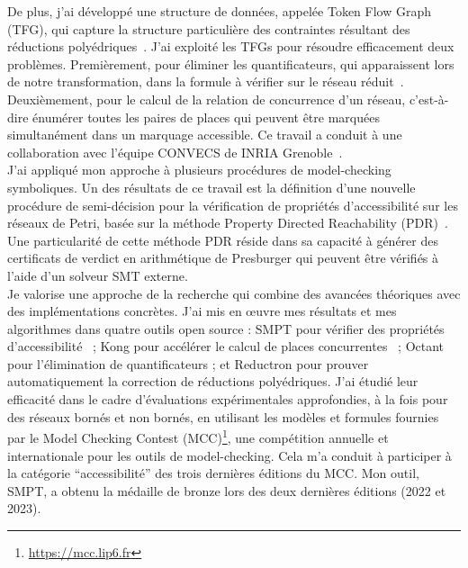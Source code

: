 De plus, j'ai développé une structure de données, appelée Token Flow Graph
(TFG), qui capture la structure particulière des contraintes résultant des
réductions polyédriques~\cite{amat_accelerating_2021,amat_leveraging_2022}. J'ai exploité les TFGs
pour résoudre efficacement deux problèmes. Premièrement, pour éliminer les
quantificateurs, qui apparaissent lors de notre transformation, dans la formule
à vérifier sur le réseau réduit~\cite{amat_project_2024}. Deuxièmement, pour le
calcul de la relation de concurrence d'un réseau, c'est-à-dire énumérer toutes
les paires de places qui peuvent être marquées simultanément dans un marquage
accessible. Ce travail a conduit à une collaboration avec l'équipe CONVECS de
INRIA Grenoble~\cite{amat_toolchain_2023}.\\

J'ai appliqué mon approche à plusieurs procédures de model-checking symboliques.
Un des résultats de ce travail est la définition d'une nouvelle procédure de
semi-décision pour la vérification de propriétés d'accessibilité sur les réseaux
de Petri, basée sur la méthode Property Directed Reachability
(PDR)~\cite{amat_property_2022}. Une particularité de cette méthode PDR réside
dans sa capacité à générer des certificats de verdict en arithmétique de
Presburger qui peuvent être vérifiés à l'aide d'un solveur SMT externe.\\

Je valorise une approche de la recherche qui combine des avancées théoriques avec
des implémentations concrètes. J'ai mis en œuvre mes résultats et mes algorithmes
dans quatre outils open source : \textsf{SMPT} pour vérifier des propriétés
d'accessibilité~\cite{amat_smpt_2023} ; \textsf{Kong} pour accélérer le calcul de places concurrentes~\cite{amat_kong_2022}
; \textsf{Octant} pour l'élimination de quantificateurs ; et \textsf{Reductron} pour
prouver automatiquement la correction de réductions polyédriques. J'ai étudié
leur efficacité dans le cadre d'évaluations expérimentales approfondies, à la
fois pour des réseaux bornés et non bornés, en utilisant les modèles et formules
fournies par le Model Checking Contest
(MCC)\footnote{\url{https://mcc.lip6.fr}}, une compétition annuelle et
internationale pour les outils de model-checking. Cela m'a conduit à participer
à la catégorie ``accessibilité'' des trois dernières éditions du MCC. Mon outil,
\textsf{SMPT}, a obtenu la médaille de bronze lors des deux dernières éditions
(2022 et 2023).

\vspace{10pt}
